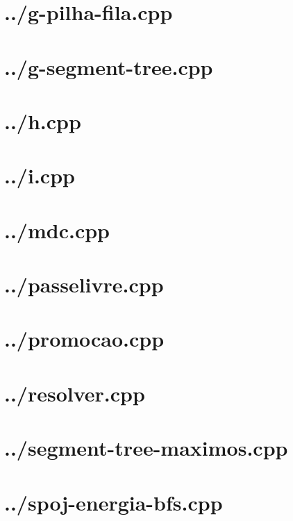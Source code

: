 \documentclass{article}
\begin{document}
\section*{../g-pilha-fila.cpp}


\section*{../g-segment-tree.cpp}


\section*{../h.cpp}


\section*{../i.cpp}


\section*{../mdc.cpp}


\section*{../passelivre.cpp}


\section*{../promocao.cpp}


\section*{../resolver.cpp}


\section*{../segment-tree-maximos.cpp}


\section*{../spoj-energia-bfs.cpp}

\end{document}
